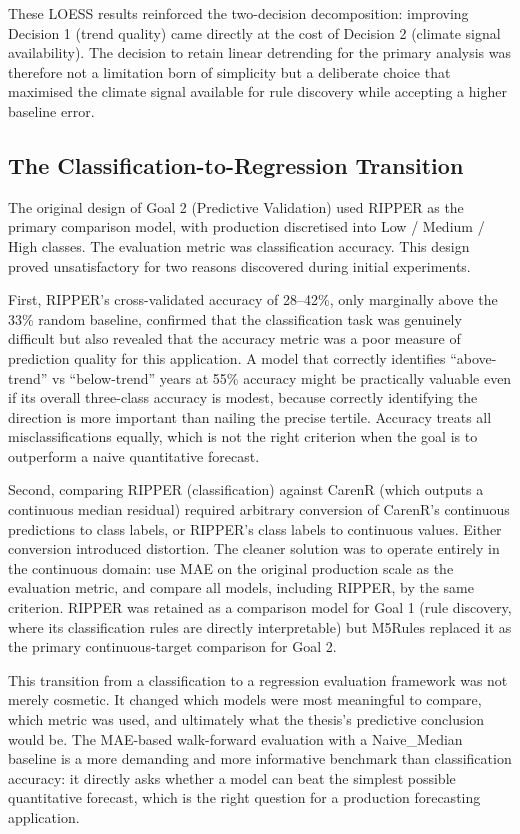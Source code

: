 These LOESS results reinforced the two-decision decomposition: improving Decision 1 (trend quality) came directly at the cost of Decision 2 (climate signal availability). The decision to retain linear detrending for the primary analysis was therefore not a limitation born of simplicity but a deliberate choice that maximised the climate signal available for rule discovery while accepting a higher baseline error.


\subsection{The Classification-to-Regression Transition}\label{sub:the_classificationtoregression_transition}

The original design of Goal 2 (Predictive Validation) used RIPPER as the primary comparison model, with production discretised into Low / Medium / High classes. The evaluation metric was classification accuracy. This design proved unsatisfactory for two reasons discovered during initial experiments.

First, RIPPER's cross-validated accuracy of 28--42\%, only marginally above the 33\% random baseline, confirmed that the classification task was genuinely difficult but also revealed that the accuracy metric was a poor measure of prediction quality for this application. A model that correctly identifies ``above-trend'' vs ``below-trend'' years at 55\% accuracy might be practically valuable even if its overall three-class accuracy is modest, because correctly identifying the direction is more important than nailing the precise tertile. Accuracy treats all misclassifications equally, which is not the right criterion when the goal is to outperform a naive quantitative forecast.

Second, comparing RIPPER (classification) against CarenR (which outputs a continuous median residual) required arbitrary conversion of CarenR's continuous predictions to class labels, or RIPPER's class labels to continuous values. Either conversion introduced distortion. The cleaner solution was to operate entirely in the continuous domain: use MAE on the original production scale as the evaluation metric, and compare all models, including RIPPER, by the same criterion. RIPPER was retained as a comparison model for Goal 1 (rule discovery, where its classification rules are directly interpretable) but M5Rules replaced it as the primary continuous-target comparison for Goal 2.

This transition from a classification to a regression evaluation framework was not merely cosmetic. It changed which models were most meaningful to compare, which metric was used, and ultimately what the thesis's predictive conclusion would be. The MAE-based walk-forward evaluation with a Naive\_Median baseline is a more demanding and more informative benchmark than classification accuracy: it directly asks whether a model can beat the simplest possible quantitative forecast, which is the right question for a production forecasting application.


